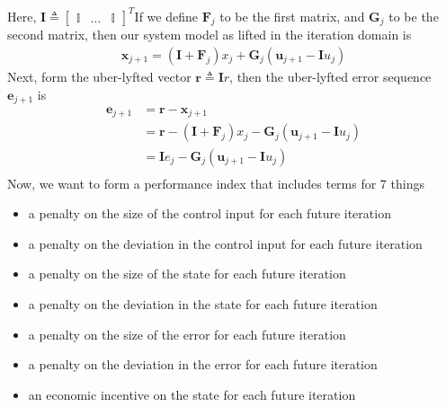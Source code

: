 \documentclass{article}
\begin{document}
Here, $\mathbf{I}\triangleq \begin{bmatrix} \mathbb{I} & \hdots & \mathbb{I} \end{bmatrix}^T$If we define $\mathbf{F}_j$ to be the first matrix, and $\mathbf{G}_j$ to be the second matrix, then our system model as lifted in the iteration domain is
\begin{align}
\mathbf{x}_{j+1} = \left(\mathbf{I} +\mathbf{F}_j \right)x_j + \mathbf{G}_j \left(\mathbf{u}_{j+1} - \mathbf{I}u_j \right)
\end{align}
Next, form the uber-lyfted vector $\mathbf{r} \triangleq \mathbf{I} r$, then the uber-lyfted error sequence $\mathbf{e}_{j+1}$ is
\begin{align}
\mathbf{e}_{j+1} 
& = \mathbf{r} - \mathbf{x}_{j+1}\\
& = \mathbf{r} - \left(\mathbf{I} +\mathbf{F}_j \right)x_j - \mathbf{G}_j \left(\mathbf{u}_{j+1} - \mathbf{I}u_j \right)\\
& = \mathbf{I} e_j - \mathbf{G}_j \left(\mathbf{u}_{j+1} - \mathbf{I}u_j \right)\\
\end{align}
Now, we want to form a performance index that includes terms for 7 things 
\begin{itemize}
	\item a penalty on the size of the control input for each future iteration
	\item a penalty on the deviation in the control input for each future iteration
	\item a penalty on the size of the state for each future iteration
	\item a penalty on the deviation in the state for each future iteration
	\item a penalty on the size of the error for each future iteration
	\item a penalty on the deviation in the error for each future iteration
	\item an economic incentive on the state for each future iteration
\end{itemize}
\end{document}
